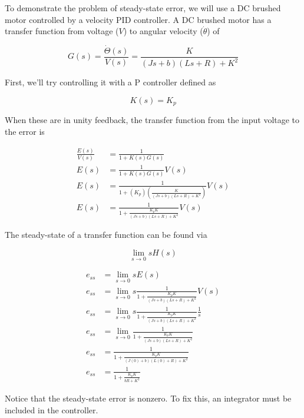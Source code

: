 To demonstrate the problem of \gls{steady-state error}, we will use a DC brushed
motor controlled by a velocity PID controller. A DC brushed motor has a transfer
function from voltage ($V$) to angular velocity ($\dot{\theta}$) of

\begin{equation}
  G(s) = \frac{\dot{\Theta}(s)}{V(s)} = \frac{K}{(Js+b)(Ls+R)+K^2}
\end{equation}

First, we'll try controlling it with a P controller defined as

\begin{equation*}
  K(s) = K_p
\end{equation*}

When these are in unity feedback, the transfer function from the input voltage
to the error is

\begin{align*}
  \frac{E(s)}{V(s)} &= \frac{1}{1 + K(s)G(s)} \\
  E(s) &= \frac{1}{1 + K(s)G(s)} V(s) \\
  E(s) &= \frac{1}{1 + (K_p) \left(\frac{K}{(Js+b)(Ls+R)+K^2}\right)} V(s) \\
  E(s) &= \frac{1}{1 + \frac{K_p K}{(Js+b)(Ls+R)+K^2}} V(s)
\end{align*}

The steady-state of a transfer function can be found via

\begin{equation}
  \lim_{s\to0} sH(s)
\end{equation}

\begin{align}
  e_{ss} &= \lim_{s\to0} sE(s) \nonumber \\
  e_{ss} &= \lim_{s\to0} s \frac{1}{1 + \frac{K_p K}{(Js+b)(Ls+R)+K^2}} V(s)
    \nonumber \\
  e_{ss} &= \lim_{s\to0} s \frac{1}{1 + \frac{K_p K}{(Js+b)(Ls+R)+K^2}}
    \frac{1}{s} \nonumber \\
  e_{ss} &= \lim_{s\to0} \frac{1}{1 + \frac{K_p K}{(Js+b)(Ls+R)+K^2}}
    \nonumber \\
  e_{ss} &= \frac{1}{1 + \frac{K_p K}{(J(0)+b)(L(0)+R)+K^2}} \nonumber \\
  e_{ss} &= \frac{1}{1 + \frac{K_p K}{bR+K^2}} \label{eq:ss_nonzero}
\end{align}

Notice that the \gls{steady-state error} is nonzero. To fix this, an integrator
must be included in the controller.

